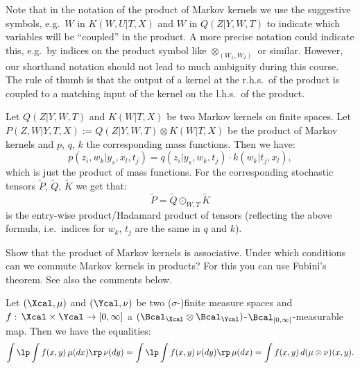\begin{Rem}
    Note that in the notation of the product of Markov kernels we use the suggestive symbols, e.g.\ $W$ in $K(W,U|T,X)$ and $W$ in $Q(Z|Y,W,T)$ to indicate which variables will be ``coupled'' in the product.
    A more precise notation could indicate this, e.g.\ by indices on the product symbol like $\otimes_{(W_1,W_2)}$ or similar. However, our shorthand notation should not lead to much ambiguity during this course.
    The rule of thumb is that the output of a kernel at the r.h.s.\ of the product is coupled to a matching input of the kernel on the l.h.s.\ of the product.
\end{Rem}

\begin{Eg}
    Let $Q(Z|Y,W,T)$ and $K(W|T,X)$ be two Markov kernels on finite spaces.
    Let $P(Z,W|Y,T,X) := Q(Z|Y,W,T) \otimes K(W|T,X)$ be the product of Markov kernels and $p$, $q$, $k$ the corresponding mass functions.
    Then we have:
    \[  p(z_i,w_k|y_s,x_l,t_j) = q(z_i|y_s,w_k,t_j) \cdot k(w_k|t_j,x_l),  \]
    which is just the product of mass functions.
    For the corresponding stochastic tensors $\tilde P$, $\tilde Q$, $\tilde K$ we get that:    
    \[\tilde P = \tilde Q \odot_{W,T} \tilde K\]
    is the entry-wise product/Hadamard product of tensors (reflecting the above formula, i.e.\ indices for $w_k$, $t_j$  are the same in $q$ and $k$).
\end{Eg}

\begin{Exc}\label{mk-product-commutes}
    Show that the product of Markov kernels is associative.
    Under which conditions can we commute Markov kernels in products?
    For this you can use Fubini's theorem. See also the comments below.
\end{Exc}

\begin{Thm}\label{fubini}
    Let $(\Xcal,\mu)$ and $(\Ycal,\nu)$ be two ($\sigma$-)finite measure spaces and $f:\,\Xcal \times \Ycal \to [0,\infty]$ a $(\Bcal_\Xcal\otimes\Bcal_\Ycal)$-$\Bcal_{[0,\infty]}$-measurable map.
    Then we have the equalities:
    \[ \int\lp\int f(x,y)\, \mu(dx)\rp\,\nu(dy) = \int\lp\int f(x,y)\, \nu(dy)\rp\,\mu(dx) = \int f(x,y) \, d(\mu\otimes\nu)(x,y). \]
\end{Thm}

